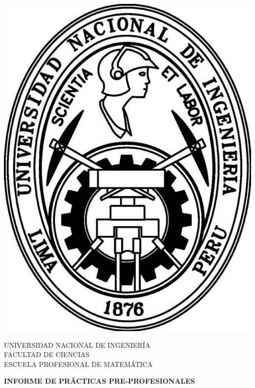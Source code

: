 \documentclass[a4paper,12pt]{report}
\theoremstyle{definition}
\begin{document}
	\begin{minipage}{0.15\linewidth}
		\includegraphics[width=\linewidth]{logo.jpg}
	\end{minipage}
	\hspace{0.05\linewidth}	
	\begin{minipage}{0.8\linewidth}
		\doublespacing
		{\large UNIVERSIDAD NACIONAL DE INGENIERÍA\\		
		FACULTAD DE CIENCIAS\\		
		ESCUELA PROFESIONAL DE MATEMÁTICA}
	\end{minipage}
	
	\vspace{2cm}
	
	\begin{center}
		{\Large \textbf{INFORME DE PRÁCTICAS PRE-PROFESIONALES}}
	\end{center}

	\vspace{2cm}
\end{document}
